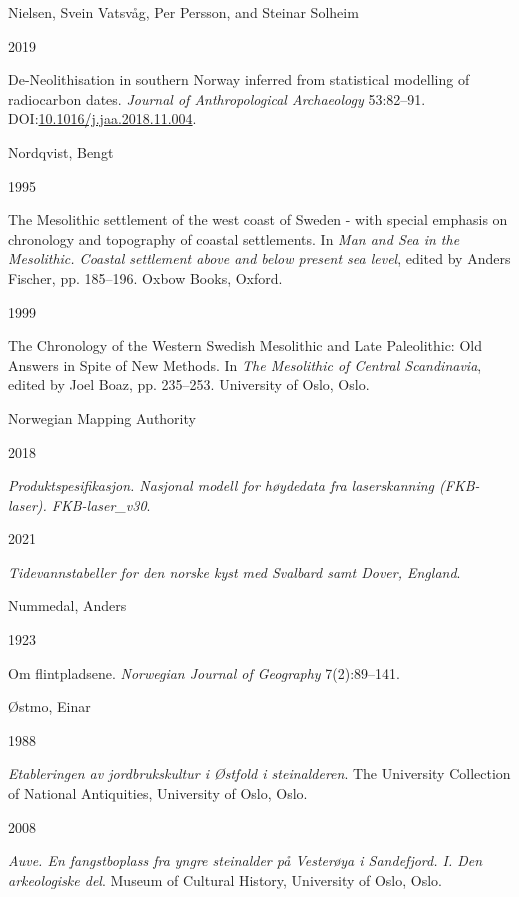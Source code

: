\documentclass[
]{article}
\newlength{\cslhangindent}
\newlength{\csllabelwidth}
\newlength{\cslentryspacingunit} %
\newenvironment{CSLReferences}[2] %
 {%
  \setlength{\parindent}{0pt}
  \ifodd #1
  \let\oldpar\par
  \def\par{\hangindent=\cslhangindent\oldpar}
  \fi
  \setlength{\parskip}{#2\cslentryspacingunit}
 }%
 {}
\newcommand{\CSLBlock}[1]{#1\hfill\break}
\newcommand{\CSLLeftMargin}[1]{\parbox[t]{\csllabelwidth}{#1}}
\newcommand{\CSLRightInline}[1]{\parbox[t]{\linewidth - \csllabelwidth}{#1}\break}
\begin{document}
\begin{CSLReferences}{0}{0}
\leavevmode{}%
\CSLBlock{Nielsen, Svein Vatsvåg, Per Persson, and Steinar Solheim}
\CSLLeftMargin{ 2019}
\CSLRightInline{De-Neolithisation in southern Norway inferred from statistical modelling of radiocarbon dates. \emph{Journal of Anthropological Archaeology} 53:82--91. DOI:\href{https://doi.org/10.1016/j.jaa.2018.11.004}{10.1016/j.jaa.2018.11.004}.}

\leavevmode{}%
\CSLBlock{Nordqvist, Bengt}
\CSLLeftMargin{ 1995}
\CSLRightInline{{The Mesolithic settlement of the west coast of Sweden - with special emphasis on chronology and topography of coastal settlements}. In \emph{{Man and Sea in the Mesolithic. Coastal settlement above and below present sea level}}, edited by Anders Fischer, pp. 185--196. Oxbow Books, Oxford.}

\leavevmode{}%
\CSLLeftMargin{ 1999 }
\CSLRightInline{{The Chronology of the Western Swedish Mesolithic and Late Paleolithic: Old Answers in Spite of New Methods}. In \emph{{The Mesolithic of Central Scandinavia}}, edited by Joel Boaz, pp. 235--253. University of Oslo, Oslo.}

\leavevmode{}%
\CSLBlock{Norwegian Mapping Authority}
\CSLLeftMargin{ 2018}
\CSLRightInline{\emph{Produktspesifikasjon. Nasjonal modell for høydedata fra laserskanning (FKB-laser). FKB-laser\_v30}.}

\leavevmode{}%
\CSLLeftMargin{ 2021 }
\CSLRightInline{\emph{{Tidevannstabeller for den norske kyst med Svalbard samt Dover, England}}.}

\leavevmode{}%
\CSLBlock{Nummedal, Anders}
\CSLLeftMargin{ 1923}
\CSLRightInline{Om flintpladsene. \emph{Norwegian Journal of Geography} 7(2):89--141.}

\leavevmode{}%
\CSLBlock{Østmo, Einar}
\CSLLeftMargin{ 1988}
\CSLRightInline{\emph{{Etableringen av jordbrukskultur i Østfold i steinalderen}}. The University Collection of National Antiquities, University of Oslo, Oslo.}

\leavevmode{}%
\CSLLeftMargin{ 2008 }
\CSLRightInline{\emph{{Auve. En fangstboplass fra yngre steinalder på Vesterøya i Sandefjord. I. Den arkeologiske del}}. Museum of Cultural History, University of Oslo, Oslo.}


\end{CSLReferences}
\end{document}
